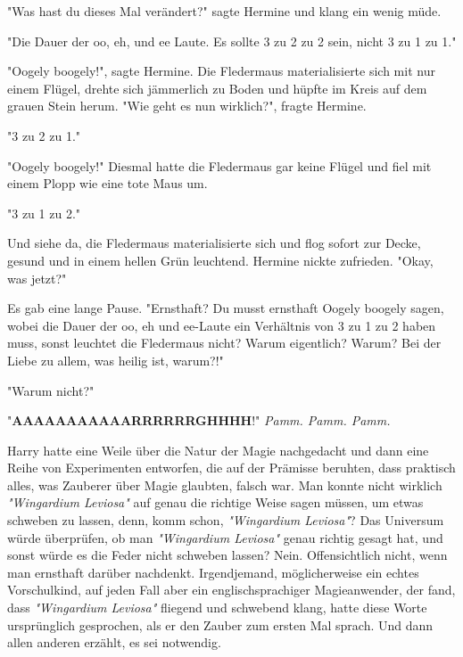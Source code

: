 {"Was hast du dieses Mal verändert?" sagte Hermine und klang ein wenig müde.

"Die Dauer der oo, eh, und ee Laute. Es sollte 3 zu 2 zu 2 sein, nicht 3 zu 1 zu 1."

"Oogely boogely!", sagte Hermine. Die Fledermaus materialisierte sich mit nur einem Flügel, drehte sich jämmerlich zu Boden und hüpfte im Kreis auf dem grauen Stein herum. "Wie geht es nun wirklich?", fragte Hermine.

"3 zu 2 zu 1."

"Oogely boogely!" Diesmal hatte die Fledermaus gar keine Flügel und fiel mit einem Plopp wie eine tote Maus um.

"3 zu 1 zu 2."

Und siehe da, die Fledermaus materialisierte sich und flog sofort zur Decke, gesund und in einem hellen Grün leuchtend. Hermine nickte zufrieden. "Okay, was jetzt?"

Es gab eine lange Pause. "Ernsthaft? Du musst ernsthaft Oogely boogely sagen, wobei die Dauer der oo, eh und ee-Laute ein Verhältnis von 3 zu 1 zu 2 haben muss, sonst leuchtet die Fledermaus nicht? Warum eigentlich? Warum? Bei der Liebe zu allem, was heilig ist, warum?!"

"Warum nicht?"

"\textbf{AAAAAAAAAAARRRRRRGHHHH}!" \emph{Pamm. Pamm. Pamm.}

Harry hatte eine Weile über die Natur der Magie nachgedacht und dann eine Reihe von Experimenten entworfen, die auf der Prämisse beruhten, dass praktisch alles, was Zauberer über Magie glaubten, falsch war. Man konnte nicht wirklich \emph{"Wingardium Leviosa"} auf genau die richtige Weise sagen müssen, um etwas schweben zu lassen, denn, komm schon, \emph{"Wingardium Leviosa"}? Das Universum würde überprüfen, ob man \emph{"Wingardium Leviosa"} genau richtig gesagt hat, und sonst würde es die Feder nicht schweben lassen? Nein. Offensichtlich nicht, wenn man ernsthaft darüber nachdenkt. Irgendjemand, möglicherweise ein echtes Vorschulkind, auf jeden Fall aber ein englischsprachiger Magieanwender, der fand, dass \emph{"Wingardium Leviosa"} fliegend und schwebend klang, hatte diese Worte ursprünglich gesprochen, als er den Zauber zum ersten Mal sprach. Und dann allen anderen erzählt, es sei notwendig.

}
